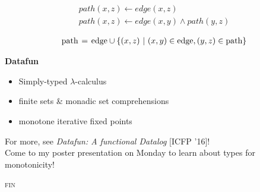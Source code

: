 \documentclass[dvipsnames]{beamer}
\newcommand{\setfor}[2]{\{#1 ~|~ #2\}}
\newcommand\xname[1]{\text{#1}}
\newcommand\rel[1]{\ensuremath{\mathit{#1}}}
\begin{document}
\newcommand\tpname[1]{\mathrm{#1}}
\newcommand\tset{\tpname{Set}~}

\begin{frame}
  \Large
  \[
  \begin{array}{l}
    \rel{path}(x,z) \leftarrow \rel{edge}(x,z)\\
    \rel{path}(x,z) \leftarrow \rel{edge}(x,y) \wedge \rel{path}(y,z)
  \end{array}
  \]

  \[\setlength\arraycolsep{.2em}\begin{array}{lcl}
    \xname{path} &=& \xname{edge} \cup \setfor{(x,z)}{(x,y) \in \xname{edge}, (y,z) \in \xname{path}}
  \end{array}\]

\end{frame}

\begin{frame}
  \huge
  \begin{center} \textbf{Datafun} \end{center}
  \LARGE
  \begin{itemize}
  \item Simply-typed $\lambda$-calculus
  \item finite sets \& monadic set comprehensions
  \item monotone\textsuperscript{\textdagger} iterative fixed points
  \end{itemize}
  \vspace{0.5cm}

  \normalsize For more, see \emph{Datafun: A functional Datalog} [ICFP '16]!
  \\[1em]
  \textsuperscript{\textdagger}Come to my poster presentation on Monday to learn about types for monotonicity!
\end{frame}


\begin{frame}
  \centering \huge \scshape fin
\end{frame}
\end{document}
